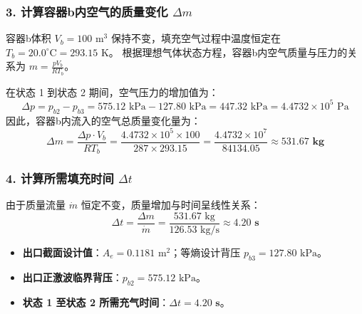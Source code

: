 \documentclass[11pt,a4paper]{article}
\begin{document}
\subsubsection{3. 计算容器b内空气的质量变化 $\Delta m$}
容器b体积 $V_b = 100\text{ m}^3$ 保持不变，填充空气过程中温度恒定在 $T_b = 20.0^\circ\text{C} = 293.15\text{ K}$。
根据理想气体状态方程，容器b内空气质量与压力的关系为 $m = \frac{p V_b}{R T_b}$。

在状态 1 到状态 2 期间，空气压力的增加值为：
\begin{equation}
    \Delta p = p_{b2} - p_{b3} = 575.12\text{ kPa} - 127.80\text{ kPa} = 447.32\text{ kPa} = 4.4732 \times 10^5\text{ Pa}
\end{equation}
因此，容器b内流入的空气总质量变化量为：
\begin{equation}
    \Delta m = \frac{\Delta p \cdot V_b}{R T_b} = \frac{4.4732 \times 10^5 \times 100}{287 \times 293.15} = \frac{4.4732 \times 10^7}{84134.05} \approx \mathbf{531.67\text{ kg}}
\end{equation}

\subsubsection{4. 计算所需填充时间 $\Delta t$}
由于质量流量 $\dot{m}$ 恒定不变，质量增加与时间呈线性关系：
\begin{equation}
    \Delta t = \frac{\Delta m}{\dot{m}} = \frac{531.67\text{ kg}}{126.53\text{ kg/s}} \approx \mathbf{4.20\text{ s}}
\end{equation}

\begin{tcolorbox}[colback=green!5!white, colframe=green!60!black, title=最终结果总结]
\begin{itemize}
    \item \textbf{出口截面设计值}：$A_e = 0.1181\text{ m}^2$；等熵设计背压 $p_{b3} = 127.80\text{ kPa}$。
    \item \textbf{出口正激波临界背压}：$p_{b2} = 575.12\text{ kPa}$。
    \item \textbf{状态 1 至状态 2 所需充气时间}：$\Delta t = \mathbf{4.20\text{ s}}$。
\end{itemize}
\end{tcolorbox}
\end{document}
